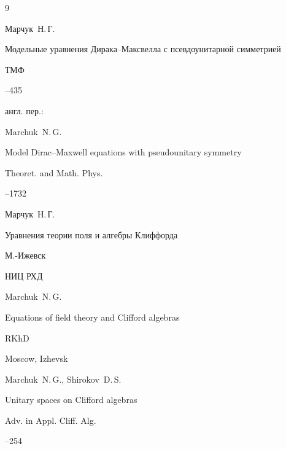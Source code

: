 \begin{thebibliography}{9}




\by Марчук~Н.\,Г.

\paper Модельные уравнения Дирака--Максвелла с псевдоунитарной симметрией

\jour ТМФ




--435

\transl англ. пер.:~

\by Marchuk~N.\,G.

\paper Model Dirac--Maxwell equations with pseudounitary symmetry

\jour Theoret. and Math. Phys.




–1732




\by Марчук~Н.\,Г.

\book Уравнения теории поля и алгебры Клиффорда

\publaddr М.-Ижевск

\publ НИЦ РХД



\misctransl

\by Marchuk~N.\,G.

\book Equations of field theory and Clifford algebras 

\publ RKhD

\publaddr Moscow, Izhevsk








\by Marchuk~N.\,G., Shirokov~D.\,S.

\paper  Unitary spaces on Clifford algebras

\jour Adv. in Appl. Cliff. Alg.




–254




\end{thebibliography}
